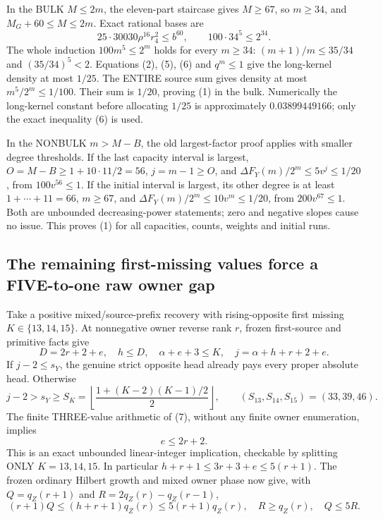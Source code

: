 \documentclass[11pt]{article}
\begin{document}
In the BULK $M\le2m$, the eleven-part staircase gives $M\ge67$,
so $m\ge34$, and $M_G+60\le M\le2m$. Exact rational bases are
\[
 25\cdot30030\rho^{16}r_4^2\le b^{60},\qquad
              100\cdot34^5\le2^{34}.                 \tag{6}
\]
The whole induction $100m^5\le2^m$ holds for every $m\ge34$:
$(m+1)/m\le35/34$ and $(35/34)^5<2$.
Equations (2), (5), (6) and $q^m\le1$ give the long-kernel
density at most $1/25$. The ENTIRE source sum gives density at most
$m^5/2^m\le1/100$. Their sum is $1/20$, proving (1) in the bulk.
Numerically the long-kernel constant before allocating $1/25$ is
approximately $0.03899449166$; only the exact inequality (6) is used.

In the NONBULK $m>M-B$, the old largest-factor proof applies with
smaller degree thresholds. If the last capacity interval is largest,
$O=M-B\ge1+10\cdot11/2=56$, $j=m-1\ge O$, and
$\Delta F_Y(m)/2^m\le5v^j\le1/20$, from $100v^{56}\le1$.
If the initial interval is largest, its other degree is at least
$1+\cdots+11=66$, $m\ge67$, and
$\Delta F_Y(m)/2^m\le10v^m\le1/20$, from $200v^{67}\le1$.
Both are unbounded decreasing-power statements; zero and negative
slopes cause no issue. This proves (1) for all capacities, counts, weights and initial runs.

\subsection{The remaining first-missing values force a FIVE-to-one raw owner gap}
Take a positive mixed/source-prefix recovery with rising-opposite
first missing $K\in\{13,14,15\}$. At nonnegative owner reverse rank
$r$, frozen first-source and primitive facts give
\[
 D=2r+2+e,\quad h\le D,\quad \alpha+e+3\le K,\quad
       j=\alpha+h+r+2+e.                              \tag{7}
\]
If $j-2\le s_Y$, the genuine strict opposite head already pays every
proper absolute head. Otherwise
\[
 j-2>s_Y\ge S_K=\left\lfloor\frac{1+(K-2)(K-1)/2}{2}\right\rfloor,
 \qquad(S_{13},S_{14},S_{15})=(33,39,46).
\]
The finite THREE-value arithmetic of (7), without any finite owner
enumeration, implies
\[
                               e\le2r+2.              \tag{8}
\]
This is an exact unbounded linear-integer implication, checkable by
splitting ONLY $K=13,14,15$. In particular
$h+r+1\le3r+3+e\le5(r+1)$.
The frozen ordinary Hilbert growth and mixed owner phase now give,
with $Q=q_Z(r+1)$ and $R=2q_Z(r)-q_Z(r-1)$,
\[
 (r+1)Q\le(h+r+1)q_Z(r)\le5(r+1)q_Z(r),\quad
                   R\ge q_Z(r),\quad\boxed{Q\le5R}.  \tag{9}
\]
\end{document}
